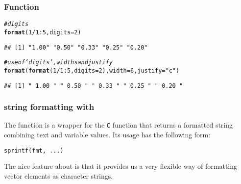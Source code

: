\documentclass[12pt]{beamer}\usepackage[]{graphicx}\usepackage[]{color}
\makeatletter
\newcommand{\hlnum}[1]{\textcolor[rgb]{0.686,0.059,0.569}{#1}}%
\newcommand{\hlstr}[1]{\textcolor[rgb]{0.192,0.494,0.8}{#1}}%
\newcommand{\hlcom}[1]{\textcolor[rgb]{0.678,0.584,0.686}{\textit{#1}}}%
\newcommand{\hlopt}[1]{\textcolor[rgb]{0,0,0}{#1}}%
\newcommand{\hlstd}[1]{\textcolor[rgb]{0.345,0.345,0.345}{#1}}%
\newcommand{\hlkwc}[1]{\textcolor[rgb]{0.333,0.667,0.333}{#1}}%
\newcommand{\hlkwd}[1]{\textcolor[rgb]{0.737,0.353,0.396}{\textbf{#1}}}%
\newenvironment{kframe}{%
 \def\at@end@of@kframe{}%
 \ifinner\ifhmode%
  \def\at@end@of@kframe{\end{minipage}}%
  \begin{minipage}{\columnwidth}%
 \fi\fi%
 \def\FrameCommand##1{\hskip\@totalleftmargin \hskip-\fboxsep
 \colorbox{shadecolor}{##1}\hskip-\fboxsep
     \hskip-\linewidth \hskip-\@totalleftmargin \hskip\columnwidth}%
 \MakeFramed {\advance\hsize-\width
   \@totalleftmargin\z@ \linewidth\hsize
   \@setminipage}}%
 {\par\unskip\endMakeFramed%
 \at@end@of@kframe}
\newenvironment{knitrout}{}{} %
\makeatother
\begin{document}
\begin{frame}[fragile]
\frametitle{Function }

\begin{knitrout}\footnotesize
{}\color{fgcolor}\begin{kframe}
\begin{alltt}
\hlcom{# digits}
\hlkwd{format}\hlstd{(}\hlnum{1}\hlopt{/}\hlnum{1}\hlopt{:}\hlnum{5}\hlstd{,} \hlkwc{digits} \hlstd{=} \hlnum{2}\hlstd{)}
\end{alltt}
\begin{verbatim}
## [1] "1.00" "0.50" "0.33" "0.25" "0.20"
\end{verbatim}
\begin{alltt}
\hlcom{# use of 'digits', widths and justify}
\hlkwd{format}\hlstd{(}\hlkwd{format}\hlstd{(}\hlnum{1}\hlopt{/}\hlnum{1}\hlopt{:}\hlnum{5}\hlstd{,} \hlkwc{digits} \hlstd{=} \hlnum{2}\hlstd{),} \hlkwc{width} \hlstd{=} \hlnum{6}\hlstd{,} \hlkwc{justify} \hlstd{=} \hlstr{"c"}\hlstd{)}
\end{alltt}
\begin{verbatim}
## [1] " 1.00 " " 0.50 " " 0.33 " " 0.25 " " 0.20 "
\end{verbatim}
\end{kframe}
\end{knitrout}

\end{frame}


\begin{frame}[fragile]
\frametitle{string formatting with }

The function {\hilit {}} is a wrapper for the \texttt{C} function  that returns a formatted string combining text and variable values. Its usage has the following form:
\begin{verbatim}
sprintf(fmt, ...)
\end{verbatim}

The nice feature about  is that it provides us a very flexible way of formatting vector elements as character strings. 

\end{frame}

\end{document}
